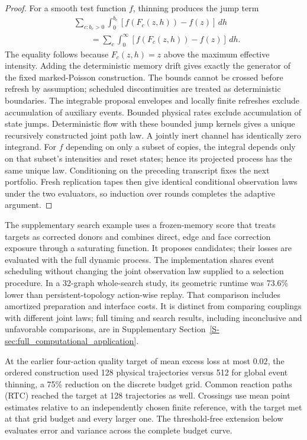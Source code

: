 \documentclass[final,5p,times,twocolumn,sort&compress]{elsarticle}
\theoremstyle{plain}
\begin{document}
\begin{proof}
For a smooth test function $f$, thinning produces the jump term
\begin{align*}
 &\sum_{c:b_c>0}\int_0^{b_c}[f(F_c(z,h))-f(z)]\,dh\\
 &\qquad=\sum_c\int_0^\infty[f(F_c(z,h))-f(z)]\,dh.
\end{align*}
The equality follows because $F_c(z,h)=z$ above the maximum effective intensity. Adding the deterministic memory drift gives exactly the generator of the fixed marked-Poisson construction. The bounds cannot be crossed before refresh by assumption; scheduled discontinuities are treated as deterministic boundaries. The integrable proposal envelopes and locally finite refreshes exclude accumulation of auxiliary events. Bounded physical rates exclude accumulation of state jumps. Deterministic flow with these bounded jump kernels gives a unique recursively constructed joint path law. A jointly inert channel has identically zero integrand. For $f$ depending on only a subset of copies, the integral depends only on that subset's intensities and reset states; hence its projected process has the same unique law. Conditioning on the preceding transcript fixes the next portfolio. Fresh replication tapes then give identical conditional observation laws under the two evaluators, so induction over rounds completes the adaptive argument.
\end{proof}
The supplementary search example uses a frozen-memory score that treats targets as corrected donors and combines direct, edge and face correction exposure through a saturating function. It proposes candidates; their losses are evaluated with the full dynamic process. The implementation shares event scheduling without changing the joint observation law supplied to a selection procedure. In a 32-graph whole-search study, its geometric runtime was 73.6\% lower than persistent-topology action-wise replay. That comparison includes amortized preparation and interface costs. It is distinct from comparing couplings with different joint laws; full timing and search results, including inconclusive and unfavorable comparisons, are in Supplementary Section~\ref{S-sec:full_computational_application}.

At the earlier four-action quality target of mean excess loss at most $0.02$, the ordered construction used 128 physical trajectories versus 512 for global event thinning, a 75\% reduction on the discrete budget grid. Common reaction paths (RTC) reached the target at 128 trajectories as well. Crossings use mean point estimates relative to an independently chosen finite reference, with the target met at that grid budget and every larger one. The threshold-free extension below evaluates error and variance across the complete budget curve.
\end{document}

